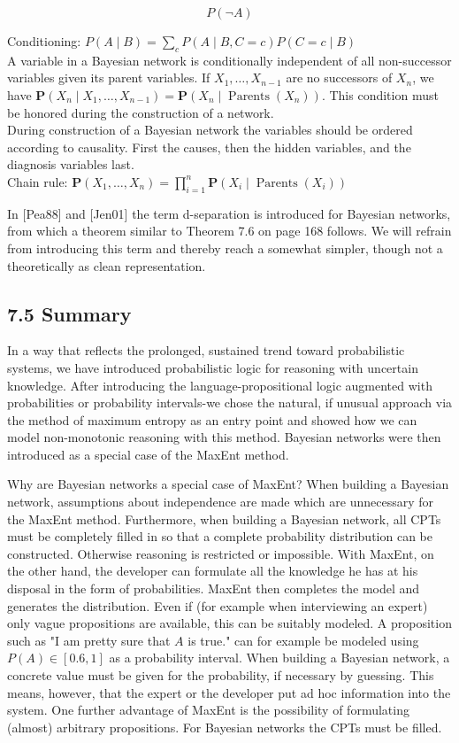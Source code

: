 \documentclass[10pt]{article}
\begin{document}
$$
P(\neg A)
$$

Conditioning: $P(A \mid B)=\sum_{c} P(A \mid B, C=c) P(C=c \mid B)$\\
A variable in a Bayesian network is conditionally independent of all non-successor variables given its parent variables. If $X_{1}, \ldots, X_{n-1}$ are no successors of $X_{n}$, we have $\boldsymbol{P}\left(X_{n} \mid X_{1}, \ldots, X_{n-1}\right)=\boldsymbol{P}\left(X_{n} \mid \operatorname{Parents}\left(X_{n}\right)\right)$. This condition must be honored during the construction of a network.\\
During construction of a Bayesian network the variables should be ordered according to causality. First the causes, then the hidden variables, and the diagnosis variables last.\\
Chain rule: $\boldsymbol{P}\left(X_{1}, \ldots, X_{n}\right)=\prod_{i=1}^{n} \boldsymbol{P}\left(X_{i} \mid \operatorname{Parents}\left(X_{i}\right)\right)$

In [Pea88] and [Jen01] the term d-separation is introduced for Bayesian networks, from which a theorem similar to Theorem 7.6 on page 168 follows. We will refrain from introducing this term and thereby reach a somewhat simpler, though not a theoretically as clean representation.

\subsection*{7.5 Summary}
In a way that reflects the prolonged, sustained trend toward probabilistic systems, we have introduced probabilistic logic for reasoning with uncertain knowledge. After introducing the language-propositional logic augmented with probabilities or probability intervals-we chose the natural, if unusual approach via the method of maximum entropy as an entry point and showed how we can model non-monotonic reasoning with this method. Bayesian networks were then introduced as a special case of the MaxEnt method.

Why are Bayesian networks a special case of MaxEnt? When building a Bayesian network, assumptions about independence are made which are unnecessary for the MaxEnt method. Furthermore, when building a Bayesian network, all CPTs must be completely filled in so that a complete probability distribution can be constructed. Otherwise reasoning is restricted or impossible. With MaxEnt, on the other hand, the developer can formulate all the knowledge he has at his disposal in the form of probabilities. MaxEnt then completes the model and generates the distribution. Even if (for example when interviewing an expert) only vague propositions are available, this can be suitably modeled. A proposition such as "I am pretty sure that $A$ is true." can for example be modeled using $P(A) \in[0.6,1]$ as a probability interval. When building a Bayesian network, a concrete value must be given for the probability, if necessary by guessing. This means, however, that the expert or the developer put ad hoc information into the system. One further advantage of MaxEnt is the possibility of formulating (almost) arbitrary propositions. For Bayesian networks the CPTs must be filled.
\end{document}
